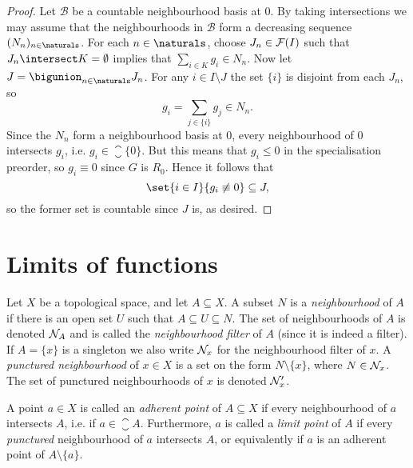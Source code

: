\documentclass[article, a4paper, 11pt, oneside]{memoir}
\numberwithin{equation}{chapter}
\newcommand{\calB}{\mathcal{B}}
\begin{document}
\begin{proof}
    Let $\calB$ be a countable neighbourhood basis at $0$. By taking intersections we may assume that the neighbourhoods in $\calB$ form a decreasing sequence $(N_n)_{n\in\naturals}$. For each $n \in \naturals$, choose $J_n \in \mathcal{F}(I)$ such that $J_n \intersect K = \emptyset$ implies that $\sum_{i \in K} g_i \in N_n$. Now let $J = \bigunion_{n\in\naturals} J_n$. For any $i \in I \setminus J$ the set $\{i\}$ is disjoint from each $J_n$, so
    \begin{equation*}
        g_i
            = \sum_{j \in \{i\}} g_j \in N_n.
    \end{equation*}
    Since the $N_n$ form a neighbourhood basis at $0$, every neighbourhood of $0$ intersects $g_i$, i.e. $g_i \in \closure{\{0\}}$. But this means that $g_i \leq 0$ in the specialisation preorder, so $g_i \equiv 0$ since $G$ is $R_0$. Hence it follows that
    \begin{equation*}
        \set{i \in I}{g_i \not\equiv 0}
            \subseteq J,
    \end{equation*}
    so the former set is countable since $J$ is, as desired.
\end{proof}


\section{Limits of functions} %

Let $X$ be a topological space, and let $A \subseteq X$. A subset $N$ is a \emph{neighbourhood} of $A$ if there is an open set $U$ such that $A \subseteq U \subseteq N$. The set of neighbourhoods of $A$ is denoted $\mathcal{N}_{A}$ and is called the \emph{neighbourhood filter} of $A$ (since it is indeed a filter). If $A = \{x\}$ is a singleton we also write $\mathcal{N}_{x}$ for the neighbourhood filter of $x$. A \emph{punctured neighbourhood} of $x \in X$ is a set on the form $N \setminus \{x\}$, where $N \in \mathcal{N}_{x}$. The set of punctured neighbourhoods of $x$ is denoted $\mathcal{N}'_{x}$.

A point $a \in X$ is called an \emph{adherent point} of $A \subseteq X$ if every neighbourhood of $a$ intersects $A$, i.e. if $a \in \closure{A}$. Furthermore, $a$ is called a \emph{limit point} of $A$ if every \emph{punctured} neighbourhood of $a$ intersects $A$, or equivalently if $a$ is an adherent point of $A \setminus \{a\}$.
\end{document}
